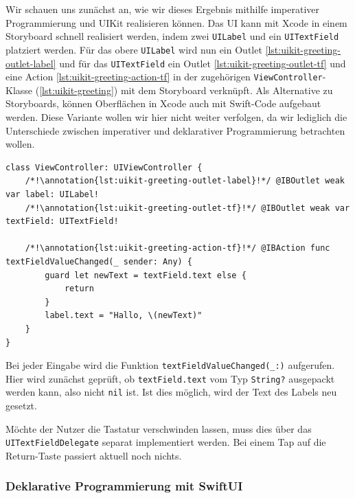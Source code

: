 \begin{bsp}
Wir schauen uns zunächst an, wie wir dieses Ergebnis mithilfe imperativer Programmierung und UIKit realisieren können. Das \acl{UI} kann mit Xcode in einem Storyboard schnell realisiert werden, indem zwei \texttt{UILabel} und ein \texttt{UITextField} platziert werden. Für das obere \texttt{UILabel} wird nun ein Outlet \ref*{lst:uikit-greeting-outlet-label} und für das \texttt{UITextField} ein Outlet \ref*{lst:uikit-greeting-outlet-tf} und eine Action \ref*{lst:uikit-greeting-action-tf} in der zugehörigen \texttt{ViewController}-Klasse (\autoref{lst:uikit-greeting}) mit dem Storyboard verknüpft. Als Alternative zu Storyboards, können Oberflächen in Xcode auch mit Swift-Code aufgebaut werden. Diese Variante wollen wir hier nicht weiter verfolgen, da wir lediglich die Unterschiede zwischen imperativer und deklarativer Programmierung betrachten wollen.
	
\begin{lstlisting}[caption={\texttt{ViewController.swift}},label={lst:uikit-greeting}]
class ViewController: UIViewController {
    /*!\annotation{lst:uikit-greeting-outlet-label}!*/ @IBOutlet weak var label: UILabel!
    /*!\annotation{lst:uikit-greeting-outlet-tf}!*/ @IBOutlet weak var textField: UITextField!

    /*!\annotation{lst:uikit-greeting-action-tf}!*/ @IBAction func textFieldValueChanged(_ sender: Any) {
        guard let newText = textField.text else {
            return
        }
        label.text = "Hallo, \(newText)"
    }
}
\end{lstlisting}
\setcounter{lstannotation}{0}

Bei jeder Eingabe wird die Funktion \texttt{textFieldValueChanged(\_:)} aufgerufen. Hier wird zunächst geprüft, ob \texttt{textField.text} vom Typ \texttt{String?} ausgepackt werden kann, also nicht \texttt{nil} ist. Ist dies möglich, wird der Text des Labels neu gesetzt.

Möchte der Nutzer die Tastatur verschwinden lassen, muss dies über das \texttt{UI\-Text\-Field\-De\-le\-gate} separat implementiert werden. Bei einem Tap auf die Return-Taste passiert aktuell noch nichts.
\end{bsp}

\subsubsection{Deklarative Programmierung mit SwiftUI}


